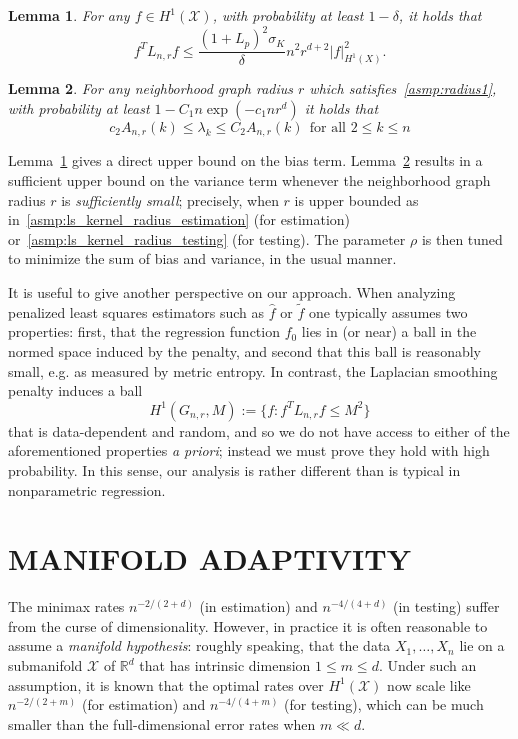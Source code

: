 \documentclass[twoside]{article}
\newcommand{\Reals}{\mathbb{R}}
\newcommand{\1}{\mathbf{1}}
\newcommand{\Rd}{\Reals^d}
\newcommand{\Lap}{L}
\newcommand{\Xset}{\mathcal{X}}
\newcommand{\wt}[1]{\widetilde{#1}}
\newcommand{\wh}[1]{\widehat{#1}}
\newtheorem{lemma}{Lemma}
\theoremstyle{definition}
\theoremstyle{remark}
\begin{document}
\begin{lemma}
	\label{lem:graph_sobolev_seminorm}
	For any $f \in H^1(\Xset)$, with probability at least $1 - \delta$, it holds that
	\begin{equation}
	\label{eqn:graph_sobolev_seminorm}
	f^T \Lap_{n,r} f \leq \frac{(1 + L_p)^2 \sigma_K}{\delta} n^2 r^{d + 2} |f|_{H^1(X)}^2.
	\end{equation}
\end{lemma}
\begin{lemma}
	\label{lem:neighborhood_eigenvalue}
	For any neighborhood graph radius $r$ which satisfies~\ref{asmp:radius1}, with probability at least $1 - C_1n\exp(-c_1nr^d)$ it holds that
	\begin{equation}
	\label{eqn:neighborhood_eigenvalue}
	c_2A_{n,r}(k) \leq \lambda_k \leq C_2A_{n,r}(k)~~\textrm{for all $2 \leq k \leq n$}
	\end{equation}
\end{lemma}

Lemma~\ref{lem:graph_sobolev_seminorm} gives a direct upper bound on the bias term. Lemma~\ref{lem:neighborhood_eigenvalue} results in a sufficient upper bound on the variance term whenever the neighborhood graph radius $r$ is \textit{sufficiently small}; precisely, when $r$ is upper bounded as in~\ref{asmp:ls_kernel_radius_estimation} (for estimation) or~\ref{asmp:ls_kernel_radius_testing} (for testing). The parameter $\rho$ is then tuned to minimize the sum of bias and variance, in the usual manner.

It is useful to give another perspective on our approach. When analyzing penalized least squares estimators such as $\wh{f}$ or $\wt{f}$ one typically assumes two properties: first, that the regression function $f_0$ lies in (or near) a ball in the normed space induced by the penalty, and second that this ball is reasonably small, e.g. as measured by metric entropy. In contrast, the Laplacian smoothing penalty induces a ball
\begin{equation*}
H^1(G_{n,r},M) := \{f: f^T \Lap_{n,r} f \leq M^2\}
\end{equation*}
that is data-dependent and random, and so we do not have access to either of the aforementioned properties \emph{a priori}; instead we must prove they hold with high probability. In this sense, our analysis is rather different than is typical in nonparametric regression.

\section{MANIFOLD ADAPTIVITY}
\label{sec:manifold_adaptivity}
The minimax rates $n^{-2/(2 + d)}$ (in estimation) and $n^{-4/(4 + d)}$ (in testing) suffer from the curse of dimensionality. However, in practice it is often reasonable to assume a \emph{manifold hypothesis}: roughly speaking, that the data $X_1,\ldots,X_n$ lie on a submanifold $\Xset$ of $\Rd$ that has intrinsic dimension $1 \leq m \leq d$. Under such an assumption, it is known \citep{bickel2007, ariascastro2018} that the optimal rates over $H^1(\Xset)$ now scale like $n^{-2/(2 + m)}$ (for estimation) and $n^{-4/(4 + m)}$ (for testing), which can be much smaller than the full-dimensional error rates when $m \ll d$. 
\end{document}
